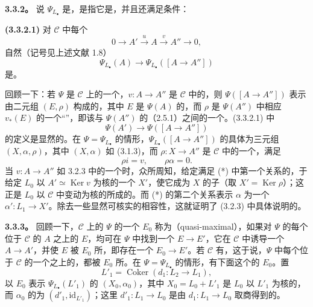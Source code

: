 \textbf{3.3.2。} 说 $\Psi_{L_\bullet}$ 是，是指它是，并且还满足条件：

\textbf{(3.3.2.1)} 对 $\mathcal C$ 中每个
\[
0\longrightarrow A'\xrightarrow{u}A\xrightarrow{v}A''\longrightarrow0,
\]
自然（记号见上述文献 1.8）
\[
\Psi_{L_\bullet}(A)\longrightarrow\Psi_{L_\bullet}([A\longrightarrow A''])
\]
是。

回顾一下：若 $\Psi$ 是 $\mathcal C$ 上的一个，$v:A\to A''$ 是 $\mathcal C$ 中的，则 $\Psi([A\to A''])$ 表示由二元组 $(E,\rho)$ 构成的，其中 $E$ 是 $\Psi(A)$ 的，而 $\rho$ 是 $\Psi(A'')$ 中相应 $v_*(E)$ 的一个“”，即该与 $\Psi(A'')$ 的（2.5.1）之间的一个。(3.3.2.1) 中
\[
\Psi(A')\longrightarrow\Psi([A\longrightarrow A''])
\]
的定义是显然的。在 $\Psi=\Psi_{L_\bullet}$ 的情形，$\Psi_{L_\bullet}([A\to A''])$ 的具体为三元组 $(X,\alpha,\rho)$，其中 $(X,\alpha)$ 如 (3.1.3)，而 $\rho:X\to A''$ 是 $\mathcal C$ 中的一个，满足
\[
\rho i=v,\qquad\rho\alpha=0.\tag{*}
\]
当 $v:A\to A''$ 如 3.2.3 中的一个时，众所周知，给定满足 (*) 中第一个关系的，于给定 $L_0$ 以 $A'\simeq\operatorname{Ker}v$ 为核的一个 $X'$，使它成为 $X$ 的子（取 $X'=\operatorname{Ker}\rho$）；这正是 $L_0$ 以 $\mathcal C$ 中变动为核的所成的。而 (*) 的第二个关系表示 $\alpha$ 为一个 $\alpha':L_1\to X'$。除去一些显然可核实的相容性，这就证明了 (3.2.3) 中具体说明的。

\textbf{3.3.3。} 回顾一下，$\mathcal C$ 上的 $\Psi$ 的一个 $E_0$ 称为（quasi-maximal），如果对 $\Psi$ 的每个位于 $\mathcal C$ 的 $A$ 之上的 $E$，均可在 $\Psi$ 中找到一个 $E\to E'$，它在 $\mathcal C$ 中诱导一个 $A\to A'$，并使 $E$ 被 $E_0$ 所，即存在一个 $E_0\to E'$。若 $\mathcal C$ 有，这于说，$\Psi$ 中每个位于 $\mathcal C$ 的一个之上的，都被 $E_0$ 所。在 $\Psi=\Psi_{L_\bullet}$ 的情形，有下面这个的 $E_0$。置
\[
L'_1=\operatorname{Coker}(d_1:L_2\longrightarrow L_1),
\]
以 $E_0$ 表示 $\Psi_{L_\bullet}(L'_1)$ 的 $(X_0,\alpha_0)$，其中 $X_0=L_0+L'_1$ 是 $L_0$ 以 $L'_1$ 为核的，而 $\alpha_0$ 的为 $(d'_1,\mathrm{id}_{L'_1})$；这里 $d'_1:L_1\to L_0$ 是由 $d_1:L_1\to L_0$ 取商得到的。

